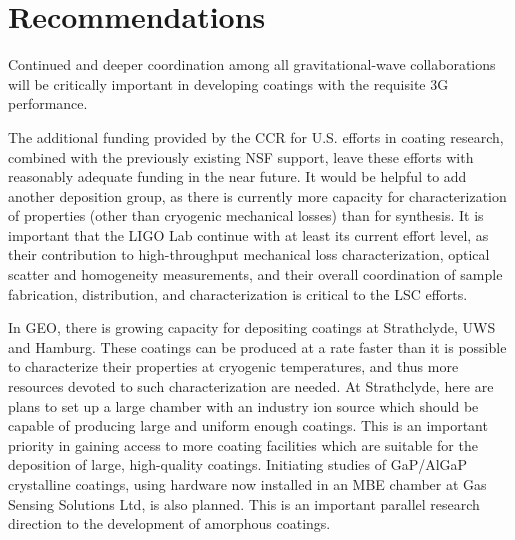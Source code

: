 \section{Recommendations}
\label{coatings_Recomm}

Continued and deeper coordination among all gravitational-wave collaborations will be critically important in developing coatings with the requisite 3G performance. 

The additional funding provided by the CCR for U.S. efforts in coating research, combined with the previously existing NSF support, leave these efforts with reasonably adequate funding in the near future. It would be helpful to add another deposition group, as there is currently more capacity for characterization of properties (other than cryogenic mechanical losses) than for synthesis. It is important that the LIGO Lab continue with at least its current effort level, as their contribution to high-throughput mechanical loss characterization, optical scatter and homogeneity measurements, and their overall coordination of sample fabrication, distribution, and characterization is critical to the LSC efforts.

In GEO, there is growing capacity for depositing coatings at Strathclyde, UWS and Hamburg. These coatings can be produced at a rate faster than it is possible to characterize their properties at cryogenic temperatures, and thus more resources devoted to such characterization are needed. 
At Strathclyde, here are plans to set up a large chamber with an industry ion source which should be capable of producing large and uniform enough coatings. This is an important priority in gaining access to more coating facilities which are suitable for the deposition of large, high-quality coatings. Initiating studies of GaP/AlGaP crystalline coatings, using hardware now installed in an MBE chamber at Gas Sensing Solutions Ltd, is also planned. This is an important parallel research direction to the development of amorphous coatings.

